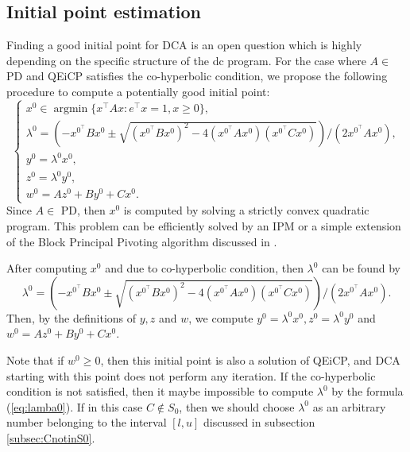 \documentclass[3p]{elsarticle}
\DeclareMathOperator{\argmin}{argmin}
\begin{document}
\subsection{Initial point estimation}\label{subsec:startingpoint}
Finding a good initial point for DCA is an open question which is highly depending on the specific structure of the dc program. For the case where $A\in$ PD and QEiCP satisfies the co-hyperbolic condition, we propose the following procedure to compute a potentially good initial point: 
\begin{equation}\label{eq:init1}
\left\lbrace 
\begin{array}{l}
x^0 \in \argmin \{x^{\top}Ax: e^{\top}x=1,x\geq 0\},\\
\lambda^0 = (-x^{0^{\top}}Bx^0 \pm \sqrt{(x^{0^{\top}}Bx^0)^2 - 4(x^{0^{\top}}Ax^0)(x^{0^{\top}}Cx^0)})/(2x^{0^{\top}}Ax^0),\\
y^0 = \lambda^0 x^0,\\
z^0 = \lambda^0 y^0,\\
w^0 = Az^0 + By^0 + Cx^0.
\end{array}
\right. 
\end{equation}
Since $A\in$ PD, then $x^0$ is computed by solving a strictly convex quadratic program. This problem can be efficiently solved by an IPM \cite{Boyd} or a simple extension of the Block Principal Pivoting algorithm discussed in \cite{Judice94}. 

After computing $x^0$ and due to co-hyperbolic condition, then $\lambda^0$ can be found by 
\begin{equation}\label{eq:lamba0}
\lambda^0 = \left(-x^{0^{\top}}Bx^0 \pm \sqrt{(x^{0^{\top}}Bx^0)^2 - 4(x^{0^{\top}}Ax^0)(x^{0^{\top}}Cx^0)}\right)/(2x^{0^{\top}}Ax^0).
\end{equation}
Then, by the definitions of $y,z$ and $w$, we compute $y^0 = \lambda^0 x^0, z^0 = \lambda^0 y^0$ and $w^0 = Az^0 + By^0 + Cx^0$.

Note that if $w^0\geq 0$, then this initial point is also a solution of QEiCP, and DCA starting with this point does not perform any iteration. If the co-hyperbolic condition is not satisfied, then it maybe impossible to compute $\lambda^0$ by the formula (\ref{eq:lamba0}). If in this case $C\notin S_0$, then we should choose $\lambda^0$ as an arbitrary number belonging to the interval $[l,u]$ discussed in subsection \ref{subsec:CnotinS0}.  
\end{document}
